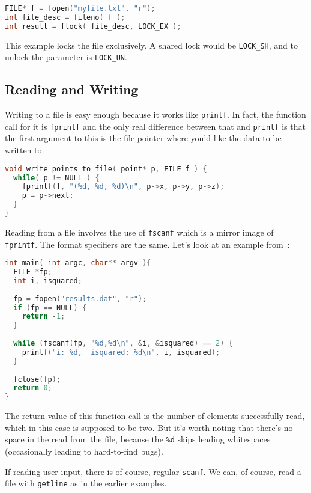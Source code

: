 \begin{lstlisting}[language=C]
FILE* f = fopen("myfile.txt", "r");
int file_desc = fileno( f );
int result = flock( file_desc, LOCK_EX );
\end{lstlisting}

This example locks the file exclusively. A shared lock would be \texttt{LOCK\_SH}, and to unlock the parameter is \texttt{LOCK\_UN}.

\subsection*{Reading and Writing}

Writing to a file is easy enough because it works like \texttt{printf}. In fact, the function call for it is \texttt{fprintf} and the only real difference between that and \texttt{printf} is that the first argument to this is the file pointer where you'd like the data to be written to:

\begin{lstlisting}[language=C]
void write_points_to_file( point* p, FILE f ) {
  while( p != NULL ) {
    fprintf(f, "(%d, %d, %d)\n", p->x, p->y, p->z);
    p = p->next;
  }
}
\end{lstlisting}

Reading from a file involves the use of \texttt{fscanf} which is a mirror image of \texttt{fprintf}. The format specifiers are the same. Let's look at an example from~\cite{cfiles}:

\begin{lstlisting}[language=C]
int main( int argc, char** argv ){
  FILE *fp;
  int i, isquared;
   
  fp = fopen("results.dat", "r");
  if (fp == NULL) {
    return -1;
  }
   
  while (fscanf(fp, "%d,%d\n", &i, &isquared) == 2) {
    printf("i: %d,  isquared: %d\n", i, isquared);
  }
  
  fclose(fp);
  return 0;
}
\end{lstlisting}

The return value of this function call is the number of elements successfully read, which in this case is supposed to be two. But it's worth noting that there's no space in the read from the file, because the \texttt{\%d} skips leading whitespaces (occasionally leading to hard-to-find bugs).

If reading user input, there is of course, regular \texttt{scanf}. We can, of course, read a file with \texttt{getline} as in the earlier examples.

